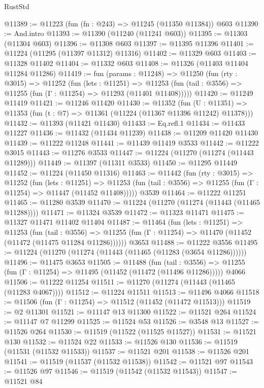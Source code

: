\begin{lexlean}{RustStd}
\begin{coremodule}
@11389 := @11223 (fun (fn : @243) => @11245 (@11350 @11384)) @603
@11390 := And.intro
@11393 := @11390 (@11240 (@11241 @603))
@11395 := @11303 (@11304 @603)
@11396 := @11308 @603
@11397 := @11395 @11396
@11401 := @11224 (@11295 (@11397 @11312) @11316)
@11402 := @11329 @603
@11403 := @11328 @11402
@11404 := @11332 @603
@11408 := @11326 (@11403 @11404 @11284 @11286)
@11419 := fun (params : @11248) =>
  @11250
    (fun (rty : @3015) =>
    @11252
      (fun (lets : @11251) =>
      @11253 (fun (tail : @3556) => @11255 (fun (Γ : @11254) => @11293 (@11401 @11408)))))
@11420 := @11249 @11419
@11421 := @11246 @11420
@11430 := @11352
    (fun (U : @11351) => @11353 (fun (t : @7) => @11361 (@11224 (@11367 @11396 @11242) @11378)))
@11432 := @11393 (@11421 @11430)
@11433 := Eq.refl.{1}
@11434 := @11433 @11227
@11436 := @11432 (@11434 @11239)
@11438 := @11209 @11420 @11430
@11439 := @11222 @11248
@11441 := @11439 @11419 @3533
@11442 := @11222 @3015
@11443 := @11276 @3533
@11447 := @11224 (@11270 (@11274 (@11443 @11289)))
@11449 := @11397 (@11311 @3533)
@11450 := @11295 @11449
@11452 := @11224 (@11450 @11316)
@11463 := @11442
    (fun (rty : @3015) =>
    @11252
      (fun (lets : @11251) =>
      @11253 (fun (tail : @3556) => @11255 (fun (Γ : @11254) => @11447 (@11452 @11408)))))
    @3539
@11464 := @11222 @11251
@11465 := @11280 @3539
@11470 := @11224 (@11270 (@11274 (@11443 (@11465 @11288))))
@11471 := @11324 @3539
@11472 := @11323 @11471
@11475 := @11327 @11471 @11402 @11404
@11487 := @11464
    (fun (lets : @11251) =>
    @11253
      (fun (tail : @3556) =>
      @11255 (fun (Γ : @11254) => @11470 (@11452 (@11472 (@11475 @11284 @11286))))))
    @3653
@11488 := @11222 @3556
@11495 := @11224 (@11270 (@11274 (@11443 (@11465 (@11283 (@3654 @11286))))))
@11496 := @11475 @3653
@11505 := @11488
    (fun (tail : @3556) => @11255 (fun (Γ : @11254) => @11495 (@11452 (@11472 (@11496 @11286)))))
    @4066
@11506 := @11222 @11254
@11511 := @11270 (@11274 (@11443 (@11465 (@11283 @4067))))
@11512 := @11224 @11511
@11513 := @11496 @4066
@11518 := @11506 (fun (Γ : @11254) => @11512 (@11452 (@11472 @11513)))
@11519 := @2 @11301
@11521 := @11147 @13 @11300
@11522 := @11521 @264
@11524 := @11147 @7 @11299
@11525 := @11524 @53
@11526 := @3548 @13
@11527 := @11526 @264
@11530 := @11519 (@11522 (@11525 @11527))
@11531 := @11521 @130
@11532 := @11524 @22
@11533 := @11526 @130
@11536 := @11519 (@11531 (@11532 @11533))
@11537 := @11521 @201
@11538 := @11526 @201
@11541 := @11519 (@11537 (@11532 @11538))
@11542 := @11521 @97
@11543 := @11526 @97
@11546 := @11519 (@11542 (@11532 @11543))
@11547 := @11521 @84

\end{coremodule}
\end{lexlean}
